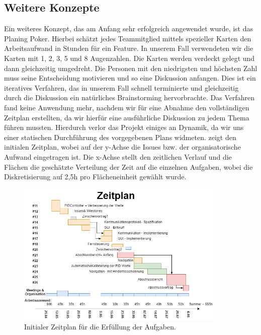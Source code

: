 \documentclass[oneside,abstractoff,a4paper]{scrartcl}
\begin{document}
\subsection{Weitere Konzepte}
\label{subsec:addConcepts}

Ein weiteres Konzept, das am Anfang sehr erfolgreich angewendet wurde, ist das Planing Poker. Hierbei schätzt jedes Teammitglied mittels spezieller Karten den Arbeitsaufwand in Stunden für ein Feature. In unserem Fall verwendeten wir die Karten mit 1, 2, 3, 5 und 8 Augenzahlen. Die Karten werden verdeckt gelegt und dann gleichzeitig umgedreht. Die Personen mit den niedrigsten und höchsten Zahl muss seine Entscheidung motivieren und so eine Diskussion anfangen. Dies ist ein iteratives Verfahren, das in unserem Fall schnell terminierte und gleichzeitig durch die Diskussion ein natürliches Brainstorming hervorbrachte. Das Verfahren fand keine Anwendung mehr, nachdem wir für eine Abnahme den vollständigen Zeitplan erstellten, da wir hierfür eine ausführliche Diskussion zu jedem Thema führen mussten. Hierdurch verlor das Projekt einiges an Dynamik, da wir uns einer statischen Durchführung des vorgegebenen Plans widmeten.  zeigt den initialen Zeitplan, wobei auf der y-Achse die Issues bzw. der organisatorische Aufwand eingetragen ist. Die x-Achse stellt den zeitlichen Verlauf und die Flächen die geschätzte Verteilung der Zeit auf die einzelnen Aufgaben, wobei die Diskretisierung auf 2,5h pro Flächeneinheit gewählt wurde.

\begin{figure}
	\includegraphics[width=0.9\textwidth]{Softwareprojekt-NXT-Zeitplan.png}
    \caption{Initialer Zeitplan für die Erfüllung der Aufgaben.}
    \label{fig:Zeitplan}
\end{figure}
\end{document}
